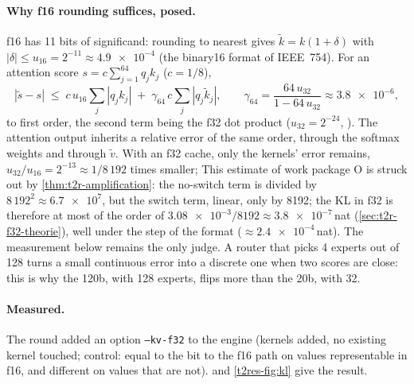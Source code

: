 \paragraph{Why f16 rounding suffices, posed.} f16 has 11 bits of significand: rounding to nearest gives $\tilde k = k(1 + \delta)$ with $|\delta| \le u_{16} = 2^{-11} \approx \num{4.9e-4}$ (the binary16 format of IEEE~754). For an attention score $s = c \sum_{j=1}^{64} q_j k_j$ ($c = 1/8$),
\[
|\tilde s - s| \;\le\; c\, u_{16} \sum_j |q_j k_j| \;+\; \gamma_{64}\, c \sum_j |q_j \tilde k_j|,
\qquad \gamma_{64} = \frac{64\, u_{32}}{1 - 64\, u_{32}} \approx \num{3.8e-6},
\]
to first order, the second term being the f32 dot product ($u_{32} = 2^{-24}$, \cite{higham2002}). The attention output inherits a relative error of the same order, through the softmax weights and through $\tilde v$. With an f32 cache, only the kernels' error remains, $u_{32}/u_{16} = 2^{-13} \approx 1/8\,192$ times smaller;  This estimate of work package O is struck out by \cref{thm:t2r-amplification}: the no-switch term is divided by $8\,192^2 \approx \num{6.7e7}$, but the switch term, linear, only by \num{8192}; the KL in f32 is therefore at most of the order of $\num{3.08e-3}/\num{8192} \approx \num{3.8e-7}$\,nat \calc{} (\cref{sec:t2r-f32-theorie}), well under the step of the format ($\approx \num{2.4e-4}$\,nat). The measurement below remains the only judge. A router that picks 4 experts out of 128 turns a small continuous error into a discrete one when two scores are close: this is why the 120b, with 128 experts, flips more than the 20b, with 32.

\paragraph{Measured.} The round added an option \texttt{--kv-f32} to the engine (kernels added, no existing kernel touched; control: equal to the bit to the f16 path on values representable in f16, and different on values that are not).  and \cref{t2res-fig:kl} give the result.

